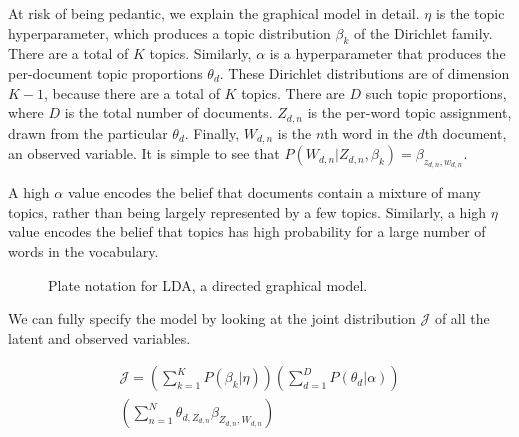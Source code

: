 \documentclass[letterpaper]{article}
\begin{document}
At risk of being pedantic, we explain the graphical model in detail.
$\eta$ is the topic hyperparameter, which produces a topic
distribution $\beta_k$ of the Dirichlet family. There are a total of
$K$ topics. Similarly, $\alpha$ is a hyperparameter that produces the
per-document topic proportions $\theta_d$. These Dirichlet
distributions are of dimension $K-1$, because there are a total of $K$
topics. There are $D$ such topic proportions, where $D$ is the total
number of documents. $Z_{d,n}$ is the per-word topic assignment, drawn
from the particular $\theta_d$. Finally, $W_{d,n}$ is the $n$th word
in the $d$th document, an observed variable. It is simple to see that
$P(W_{d,n} | Z_{d,n}, \beta_{k}) = \beta_{z_{d,n}, w_{d,n}}$.

A high $\alpha$ value encodes the belief that documents contain a
mixture of many topics, rather than being largely represented by a few
topics. Similarly, a high $\eta$ value encodes the belief that topics
has high probability for a large number of words in the vocabulary.

\begin{figure}[ht]
  \centering
  \caption{\label{fig:lda_plate} Plate notation for LDA, a directed
    graphical model.}
\end{figure}

We can fully specify the model by looking at the joint distribution
$\mathcal{J}$ of all the latent and observed variables.

\begin{multline}
 \mathcal{J} = \left( \sum_{k=1}^{K} P(\beta_k | \eta) \right) \left(
    \sum_{d=1}^{D} P(\theta_d | \alpha) \right) \\
  \left( \sum_{n=1}^{N} \theta_{d, Z_{d,n}} \beta_{Z_{d,n}, W_{d,n}} \right)  
\end{multline}
\end{document}
